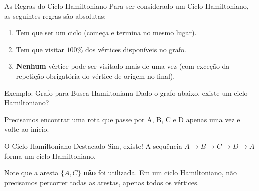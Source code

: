 \documentclass[9pt]{beamer}
\begin{document}
\begin{frame}{As Regras do Ciclo Hamiltoniano}
    Para ser considerado um Ciclo Hamiltoniano, as seguintes regras são absolutas:
    \vspace{0.5cm}
    \begin{enumerate}
        \item Tem que ser um ciclo (começa e termina no mesmo lugar).
        \item Tem que visitar $100\%$ dos vértices disponíveis no grafo.
        \item \textbf{Nenhum} vértice pode ser visitado mais de uma vez (com exceção da repetição obrigatória do vértice de origem no final).
    \end{enumerate}
\end{frame}

\begin{frame}{Exemplo: Grafo para Busca Hamiltoniana}
    Dado o grafo abaixo, existe um ciclo Hamiltoniano?
    \vspace{0.5cm}
    \begin{center}
    \end{center}
    \vspace{0.3cm}
    Precisamos encontrar uma rota que passe por A, B, C e D apenas uma vez e volte ao início.
\end{frame}

\begin{frame}{O Ciclo Hamiltoniano Destacado}
    Sim, existe! A sequência $A \rightarrow B \rightarrow C \rightarrow D \rightarrow A$ forma um ciclo Hamiltoniano.
    \vspace{0.5cm}
    \begin{center}
    \end{center}
    \vspace{0.3cm}
    Note que a aresta $\{A, C\}$ \textbf{não} foi utilizada. Em um ciclo Hamiltoniano, não precisamos percorrer todas as arestas, apenas todos os vértices.
\end{frame}
\end{document}

